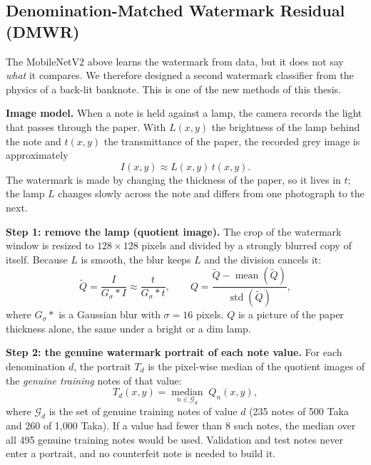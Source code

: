 \subsection{Denomination-Matched Watermark Residual (DMWR)}
\label{sec:dmwr}
The MobileNetV2 above learns the watermark from data, but it does not say \emph{what} it compares. We therefore designed a second watermark classifier from the physics of a back-lit banknote. This is one of the new methods of this thesis.

\textbf{Image model.} When a note is held against a lamp, the camera records the light that passes through the paper. With $L(x,y)$ the brightness of the lamp behind the note and $t(x,y)$ the transmittance of the paper, the recorded grey image is approximately
\begin{equation}
I(x,y) \approx L(x,y)\, t(x,y).
\label{eq:backlit}
\end{equation}
The watermark is made by changing the thickness of the paper, so it lives in $t$; the lamp $L$ changes slowly across the note and differs from one photograph to the next.

\textbf{Step 1: remove the lamp (quotient image).} The crop of the watermark window is resized to $128\times128$ pixels and divided by a strongly blurred copy of itself. Because $L$ is smooth, the blur keeps $L$ and the division cancels it:
\begin{equation}
\tilde Q = \frac{I}{G_{\sigma} * I} \approx \frac{t}{G_{\sigma} * t}, \qquad
Q = \frac{\tilde Q - \operatorname{mean}(\tilde Q)}{\operatorname{std}(\tilde Q)},
\label{eq:quotient}
\end{equation}
where $G_\sigma *$ is a Gaussian blur with $\sigma = 16$ pixels. $Q$ is a picture of the paper thickness alone, the same under a bright or a dim lamp.

\textbf{Step 2: the genuine watermark portrait of each note value.} For each denomination $d$, the portrait $T_d$ is the pixel-wise median of the quotient images of the \emph{genuine training} notes of that value:
\begin{equation}
T_d(x,y) = \operatorname*{median}_{n \in \mathcal{G}_d} \; Q_n(x,y),
\label{eq:portrait}
\end{equation}
where $\mathcal{G}_d$ is the set of genuine training notes of value $d$ (235 notes of 500 Taka and 260 of 1,000 Taka). If a value had fewer than 8 such notes, the median over all 495 genuine training notes would be used. Validation and test notes never enter a portrait, and no counterfeit note is needed to build it.

